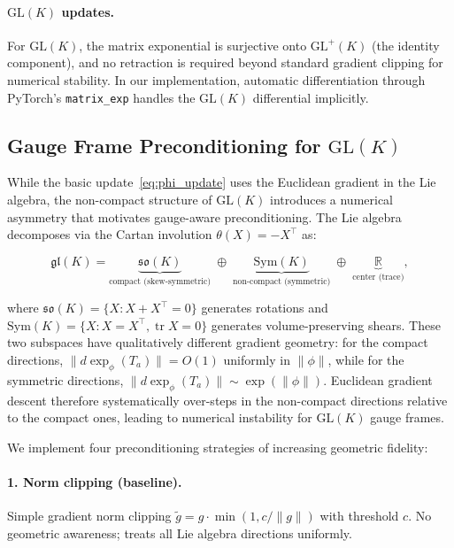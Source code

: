 \documentclass[twoside,11pt]{article}
\begin{document}
\paragraph{$\mathrm{GL}(K)$ updates.} For $\mathrm{GL}(K)$, the matrix exponential is surjective onto $\mathrm{GL}^+(K)$ (the identity component), and no retraction is required beyond standard gradient clipping for numerical stability. In our implementation, automatic differentiation through PyTorch's \texttt{matrix\_exp} handles the $\mathrm{GL}(K)$ differential implicitly.

\subsection{Gauge Frame Preconditioning for $\mathrm{GL}(K)$}
\label{sec:glk_preconditioning}

While the basic update~\eqref{eq:phi_update} uses the Euclidean gradient in the Lie algebra, the non-compact structure of $\mathrm{GL}(K)$ introduces a numerical asymmetry that motivates gauge-aware preconditioning. The Lie algebra decomposes via the Cartan involution $\theta(X) = -X^\top$ as:

\begin{equation}
\mathfrak{gl}(K) = \underbrace{\mathfrak{so}(K)}_{\text{compact (skew-symmetric)}} \;\oplus\; \underbrace{\mathrm{Sym}(K)}_{\text{non-compact (symmetric)}} \;\oplus\; \underbrace{\mathbb{R}}_{\text{center (trace)}},
\label{eq:cartan_decomposition}
\end{equation}

where $\mathfrak{so}(K) = \{X : X + X^\top = 0\}$ generates rotations and $\mathrm{Sym}(K) = \{X : X = X^\top, \operatorname{tr} X = 0\}$ generates volume-preserving shears. These two subspaces have qualitatively different gradient geometry: for the compact directions, $\|d\exp_\phi(T_a)\| = O(1)$ uniformly in $\|\phi\|$, while for the symmetric directions, $\|d\exp_\phi(T_a)\| \sim \exp(\|\phi\|)$. Euclidean gradient descent therefore systematically over-steps in the non-compact directions relative to the compact ones, leading to numerical instability for $\mathrm{GL}(K)$ gauge frames.

We implement four preconditioning strategies of increasing geometric fidelity:

\paragraph{1. Norm clipping (baseline).}
Simple gradient norm clipping $\tilde{g} = g \cdot \min(1, c/\|g\|)$ with threshold $c$. No geometric awareness; treats all Lie algebra directions uniformly.
\end{document}
